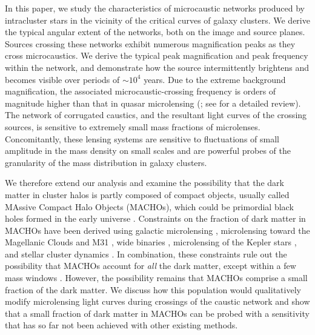 \documentclass{aastex6}
\begin{document}
In this paper, we study the characteristics of microcaustic networks produced by intracluster 
stars in the vicinity of the critical curves of galaxy clusters. We derive the typical angular extent of the 
networks, both on the image and source planes. Sources crossing these networks exhibit 
numerous magnification peaks as they cross microcaustics. We derive the typical peak magnification and peak frequency within the network, and demonstrate how the source intermittently brightens and becomes visible over periods of $\sim 10^4$ years. Due to the extreme background magnification, the associated microcaustic-crossing frequency is orders of magnitude higher than that in quasar microlensing 
(\cite{1979Natur.282..561C}; see \cite{2010GReGr..42.2127S} for a detailed review).
The network of corrugated caustics, and the resultant light curves of the crossing sources, is sensitive to extremely small mass fractions of microlenses. Concomitantly, these lensing systems are sensitive to fluctuations of small amplitude in the mass density on small scales and are powerful probes of the
granularity of the mass distribution in galaxy clusters.

We therefore extend our analysis and examine the possibility that the dark matter in cluster halos 
is partly composed of compact objects, usually called MAssive Compact Halo
Objects (MACHOs), which could be primordial black holes formed in the early universe
\citep{1986ApJ...304....1P,1991ApJ...366..412G}. Constraints on the fraction of dark matter in 
MACHOs have been derived using galactic microlensing \citep{2001ApJ...550L.169A}, 
microlensing toward the Magellanic Clouds and M31 \citep{2007A&A...469..387T, 2017arXiv170102151N}, wide binaries \citep{2004ApJ...601..289C,2004ApJ...601..311Y,2009MNRAS.396L..11Q}, microlensing of the Kepler stars \citep{2011PhRvL.107w1101G, PhysRevLett.111.181302}, and stellar cluster dynamics \citep{2016ApJ...824L..31B}. In combination, these constraints rule out the possibility that MACHOs account for {\em all} the dark matter, except within a few mass windows \citep{2017arXiv170505567C}. However, the possibility remains that MACHOs comprise a small fraction of the dark matter. We discuss how this population would qualitatively modify microlensing light curves during crossings of the caustic network and show that a small fraction of dark matter in MACHOs can be probed with a sensitivity that has so far not been achieved with other existing methods. 
\end{document}
